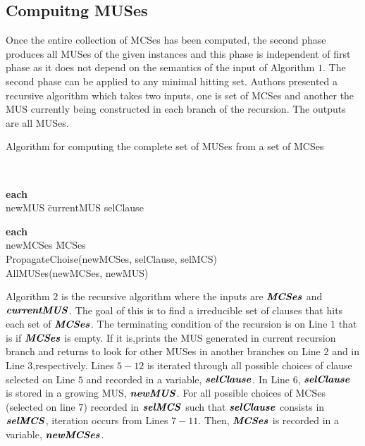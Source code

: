 \subsection{Compuitng MUSes}
Once the entire collection of MCSes has been computed, the second phase produces all MUSes of the given instances and this phase is independent of first phase as it does not depend on the semantics of the input of Algorithm $1$. The second phase can be applied to any minimal hitting set. Authors presented a recursive algorithm which takes two inputs, one is set of MCSes and another the MUS currently being constructed in each branch of the recursion. The outputs are all MUSes.\newline
\begin{Algorithm}
\caption{Algorithm for computing the complete set of MUSes from a set of MCSes}
\label{alg:allmuses}
	\begin{algorithm}{}{}
		\begin{IF}{}
			 \\
			\RETURN
		\end{IF}
		\begin{FOR}{\textbf{each} } \\
			newMUS \= currentMUS \cup selClause \\
			\begin{FOR}{\textbf{each} } \\
				newMCSes \= MCSes \\
				PropagateChoise(newMCSes, selClause, selMCS) \\
				AllMUSes(newMCSes, newMUS) \\
			\end{FOR}
		\end{FOR}
		\RETURN
	\end{algorithm}
\end{Algorithm}
Algorithm $2$ is the recursive algorithm where the inputs are $\textbf{\textit{MCSes}}$ and $\textbf{\textit{currentMUS}}$. The goal of this is to find a irreducible set of clauses that hits each set of $\textbf{\textit{MCSes}}$. The terminating condition of the recursion is on Line $1$ that is if $\textbf{\textit{MCSes}}$ is empty. If it is,prints the MUS generated in current recursion branch and returns to look for other MUSes in another branches on Line $2$ and in Line $3$,respectively. Lines $5-12$ is iterated through all possible choices of clause selected on Line $5$ and recorded in a variable, $\textbf{\textit{selClause}}$. In Line $6$, $\textbf{\textit{selClause}}$ is stored in a growing MUS, $\textbf{\textit{newMUS}}$. For all possible choices of MCSes (selected on line $7$) recorded in $\textbf{\textit{selMCS}}$ such that $\textbf{\textit{selClause}}$ consists in $\textbf{\textit{selMCS}}$, iteration occurs from Lines $7-11$. Then, $\textbf{\textit{MCSes}}$ is recorded in a variable, $\textbf{\textit{newMCSes}}$.\newline

